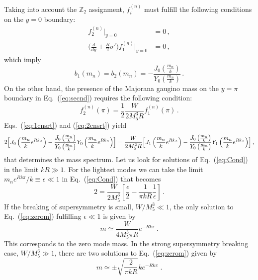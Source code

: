 \documentclass[a4paper,12pt]{article}
\newcommand{\Zparity}{\ensuremath{\mathbb{Z}_2}}
\begin{document}
Taking into account the $\Zparity$ assignment, 
$f_i^{(n)}$ must fulfill the following conditions on
the $y=0$ boundary:
\begin{align}
    f_2^{(n)} \Bigr\vert_{y=0} & = 0\, ,\nonumber \\
    \biggl(\frac{d}{dy} + \frac{R}{2} \sigma'
     \biggr)f_{1}^{(n)}\Bigr\vert_{y=0} & = 0\, ,
\end{align}
which imply
\begin{equation}
b_1(m_n) = b_2(m_n) = -
\frac{J_0\left(\frac{m_n}{k}\right)}{Y_0\left(\frac{m_n}{k}\right)}
\label{eq:1cnsrt}\, .
\end{equation}
On the other hand, the presence of the Majorana gaugino mass on the
$y=\pi$ boundary in Eq.~(\ref{eq:secnd}) requires the following
condition:
\begin{equation}
    f_{2}^{(n)}(\pi)= 
\frac{1}{2}\frac{W}{2M_{5}^{3} R} f_{1}^{(n)}(\pi)\, .
    \label{eq:2cnsrt}
\end{equation}
Eqs.~(\ref{eq:1cnsrt}) and (\ref{eq:2cnsrt}) yield
\begin{equation}
2\Bigl[J_0 \left(\frac{m_n}{k} e^{Rk\pi } \right) -
\frac{J_0\left(\frac{m_n}{k} \right)}{Y_0\left(\frac{m_n}{k} \right)}
Y_0\left(\frac{m_n}{k} e^{Rk\pi } \right) \Bigr] = \frac{W}{2M_{5}^{2} R}
\Bigl[J_1 \left(\frac{m_n}{k} e^{Rk\pi } \right) -
\frac{J_0\left(\frac{m_n}{k} \right)}{Y_0\left(\frac{m_n}{k} \right)}
Y_1\left(\frac{m_n}{k} e^{Rk\pi } \right) \Bigr]\, ,
\label{eq:Cond}
\end{equation}
that determines the mass spectrum.
Let us look for solutions of Eq.~(\ref{eq:Cond})
in the limit $kR \gg 1$. 
For the lightest modes
we can take
the limit  
 $m_n e^{R k \pi} /k \equiv \epsilon\ll 1$ 
in  Eq.~(\ref{eq:Cond})
that becomes
\begin{equation}
2 = \frac{W}{2 M_{5}^{3}} \left[\frac{\epsilon}{2} - \frac{1}{\pi k R}
    \frac{1}{\epsilon} \right]\, .
\label{eq:zerom}
\end{equation}
If the breaking of supersymmetry is small,  $W/M_{5}^{3} \ll 1$,
the only solution to Eq.~(\ref{eq:zerom}) 
fulfilling $\epsilon\ll 1$ 
is given by
\begin{equation}
 m \simeq \frac{W}{4 M_{5}^{3} \pi R} e^{-Rk\pi}\, .
\end{equation}
This corresponds to the zero mode mass.
In the strong supersymmetry breaking case, 
$W/M_{5}^{3} \gg 1$,
there are two solutions to Eq.~(\ref{eq:zerom}) given by
\begin{equation}
 m \simeq \pm\sqrt{\frac{2}{\pi k R}} k e^{-Rk\pi}\; .
\end{equation}
\end{document}
